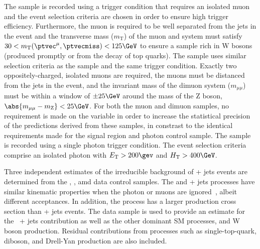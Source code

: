 
The \mj sample is recorded using a trigger condition that requires an
isolated muon and the event selection criteria are chosen in order to
ensure high trigger efficiency. Furthermore, the muon is required to
be well separated from the jets in the event and the transverse mass
($m_{\text{T}}$) of the muon and \ptvecmiss system must satisfy $30 <
m_\text{T}(\ptvec^\mu,\ptvecmiss) < 125\GeV$ to ensure a sample rich
in W bosons (produced promptly or from the decay of top quarks). The
\mmj sample uses similar selection criteria as the \mj sample and the
same trigger condition. Exactly two oppositely-charged, isolated muons
are required, the muons must be distanced from the jets in the event,
and the invariant mass of the dimuon system ($m_{\mu\mu}$) must be
within a window of $\pm 25\GeV$ around the mass of the Z boson, $
\abs{m_{\mu\mu} - m_\text{Z}} < 25\GeV$. For both the muon and dimuon
samples, no requirement is made on the variable \alphat in order to
increase the statistical precision of the predictions derived from
these samples, in constrast to the identical \alphat requirements made
for the signal region and photon control sample. The \gj sample is
recorded using a single photon trigger condition. The event selection
criteria comprise an isolated photon with $\Et > 200\gev$ and $\scalht
> 400\GeV$.

Three independent estimates of the irreducible background of \znunu +
jets events are determined from the \gj, \mmj, amd \mj data control
samples. The \gj and \zmumu + jets processes have similar kinematic
properties when the photon or muons are ignored~\cite{Bern:2011pa}, 
albeit different acceptances. In addition, the \gj process has a
larger production cross section than \znunu + jets events. The \mj
data sample is used to provide an estimate for the \znunu\ + jets
contribution as well as the other dominant SM processes, \ttbar and W
boson production. Residual contributions from processes such as
single-top-quark, diboson, and Drell-Yan production are also included.

